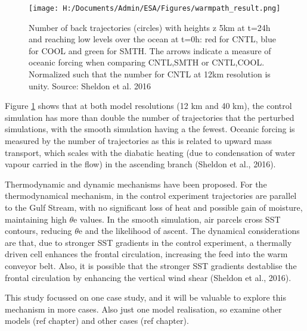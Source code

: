 \begin{figure}

	\texttt{[image: H:/Documents/Admin/ESA/Figures/warmpath\_result.png]}
	\caption{Number of back trajectories (circles) with heights z 5km at t=24h and reaching low levels over the ocean at t=0h: red for CNTL, blue for COOL and green for SMTH. The arrows indicate a measure of oceanic forcing when comparing CNTL,SMTH or CNTL,COOL. Normalized such that the number for CNTL at 12km resolution is unity. Source: Sheldon et al. 2016}\label{fig:wp_result}
	\centering
\end{figure}

Figure \ref{fig:wp_result} shows that at both model resolutions (12 km and 40 km), the control simulation has more than double the number of trajectories that the perturbed simulations, with the smooth simulation having a the fewest. Oceanic forcing is measured by the number of trajectories as this is related to upward mass transport, which scales with the diabatic heating (due to condensation of water vapour carried in the flow) in the ascending branch (Sheldon et al., 2016).

Thermodynamic and dynamic mechanisms have been proposed. For the thermodynamical mechanism, in the control experiment trajectories are parallel to the Gulf Stream, with no significant loss of heat and possible gain of moisture, maintaining high $\theta$e values. In the smooth simulation, air parcels cross SST contours, reducing $\theta$e and the likelihood of ascent. The dynamical considerations are that, due to stronger SST gradients in the control experiment, a thermally driven cell enhances the frontal circulation, increasing the feed into the warm conveyor belt. Also, it is possible that the stronger SST gradients destablise the frontal circulation by enhancing the vertical wind shear (Sheldon et al., 2016).



This study \cite{sheldon2017warm}  focussed on one case study, and it will be valuable to explore this mechanism in more cases. Also just one model realisation, so examine other models (ref chapter) and other cases (ref chapter).


